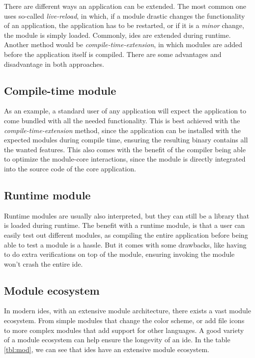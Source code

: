 There are different ways an application can be extended. The most common one
uses so-called \textit{live-reload}, in which, if a module drastic changes the
functionality of an application, the application has to be restarted, or if it
is a \textit{minor} change, the module is simply loaded. Commonly, \gls*{ide}s
are extended during runtime. Another method would be
\textit{compile-time-extension}, in which modules are added before the
application itself is compiled. There are some advantages and disadvantage in
both approaches.

\subsection{Compile-time module}

As an example, a standard user of any application will expect the application to
come bundled with all the needed functionality. This is best achieved with the
\textit{compile-time-extension} method, since the application can be installed
with the expected modules during compile time, ensuring the resulting binary
contains all the wanted features. This also comes with the benefit of the
compiler being able to optimize the module-core interactions, since the module
is directly integrated into the source code of the core application.

\subsection{Runtime module}

Runtime modules are usually also interpreted, but they can still be a
library that is loaded during runtime. The benefit with a runtime module,
is that a user can easily test out different modules, as compiling the entire
application before being able to test a module is a hassle. But it comes with
some drawbacks, like having to do extra verifications on top of the module,
ensuring invoking the module won't crash the entire \gls*{ide}.

\subsection{Module ecosystem}

In modern \gls*{ide}s, with an extensive module architecture, there exists a
vast module ecosystem. From simple modules that change the color scheme, or
add file icons to more complex modules that add support for other languages.
A good variety of a module ecosystem can help ensure the longevity of an
\gls*{ide}. In the table \ref{tbl:mod}, we can see that \gls*{ide}s have an
extensive module ecosystem.\footnotemark{}

